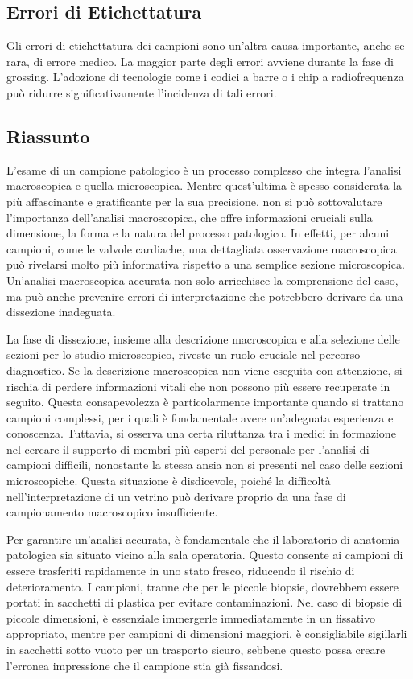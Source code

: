 \subsection{Errori di Etichettatura}
Gli errori di etichettatura dei campioni sono un'altra causa importante, anche se rara, di errore medico. La maggior parte degli errori avviene durante la fase di grossing. L'adozione di tecnologie come i codici a barre o i chip a radiofrequenza può ridurre significativamente l'incidenza di tali errori.

\subsection{Riassunto}
L'esame di un campione patologico è un processo complesso che integra l'analisi macroscopica e quella microscopica. Mentre quest'ultima è spesso considerata la più affascinante e gratificante per la sua precisione, non si può sottovalutare l'importanza dell'analisi macroscopica, che offre informazioni cruciali sulla dimensione, la forma e la natura del processo patologico. In effetti, per alcuni campioni, come le valvole cardiache, una dettagliata osservazione macroscopica può rivelarsi molto più informativa rispetto a una semplice sezione microscopica. Un’analisi macroscopica accurata non solo arricchisce la comprensione del caso, ma può anche prevenire errori di interpretazione che potrebbero derivare da una dissezione inadeguata.

La fase di dissezione, insieme alla descrizione macroscopica e alla selezione delle sezioni per lo studio microscopico, riveste un ruolo cruciale nel percorso diagnostico. Se la descrizione macroscopica non viene eseguita con attenzione, si rischia di perdere informazioni vitali che non possono più essere recuperate in seguito. Questa consapevolezza è particolarmente importante quando si trattano campioni complessi, per i quali è fondamentale avere un’adeguata esperienza e conoscenza. Tuttavia, si osserva una certa riluttanza tra i medici in formazione nel cercare il supporto di membri più esperti del personale per l'analisi di campioni difficili, nonostante la stessa ansia non si presenti nel caso delle sezioni microscopiche. Questa situazione è disdicevole, poiché la difficoltà nell'interpretazione di un vetrino può derivare proprio da una fase di campionamento macroscopico insufficiente.

Per garantire un’analisi accurata, è fondamentale che il laboratorio di anatomia patologica sia situato vicino alla sala operatoria. Questo consente ai campioni di essere trasferiti rapidamente in uno stato fresco, riducendo il rischio di deterioramento. I campioni, tranne che per le piccole biopsie, dovrebbero essere portati in sacchetti di plastica per evitare contaminazioni. Nel caso di biopsie di piccole dimensioni, è essenziale immergerle immediatamente in un fissativo appropriato, mentre per campioni di dimensioni maggiori, è consigliabile sigillarli in sacchetti sotto vuoto per un trasporto sicuro, sebbene questo possa creare l'erronea impressione che il campione stia già fissandosi.


